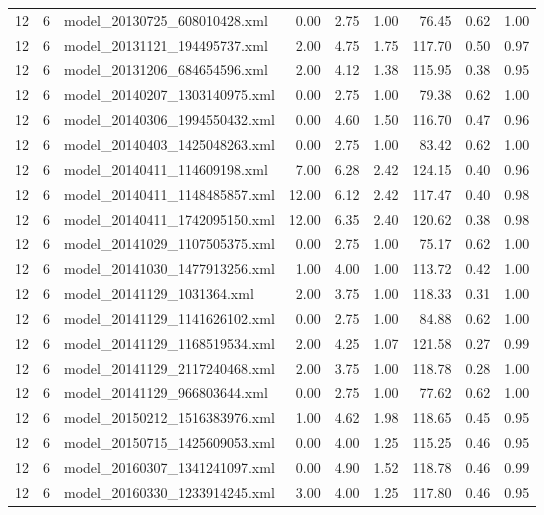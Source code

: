 \begin{table}[ht]
\begin{tabular}{rrlrrrrrr}
   12 &   6 & model\_20130725\_608010428.xml & 0.00 & 2.75 & 1.00 & 76.45 & 0.62 & 1.00 \\ 
   12 &   6 & model\_20131121\_194495737.xml & 2.00 & 4.75 & 1.75 & 117.70 & 0.50 & 0.97 \\ 
   12 &   6 & model\_20131206\_684654596.xml & 2.00 & 4.12 & 1.38 & 115.95 & 0.38 & 0.95 \\ 
   12 &   6 & model\_20140207\_1303140975.xml & 0.00 & 2.75 & 1.00 & 79.38 & 0.62 & 1.00 \\ 
   12 &   6 & model\_20140306\_1994550432.xml & 0.00 & 4.60 & 1.50 & 116.70 & 0.47 & 0.96 \\ 
   12 &   6 & model\_20140403\_1425048263.xml & 0.00 & 2.75 & 1.00 & 83.42 & 0.62 & 1.00 \\ 
   12 &   6 & model\_20140411\_114609198.xml & 7.00 & 6.28 & 2.42 & 124.15 & 0.40 & 0.96 \\ 
   12 &   6 & model\_20140411\_1148485857.xml & 12.00 & 6.12 & 2.42 & 117.47 & 0.40 & 0.98 \\ 
   12 &   6 & model\_20140411\_1742095150.xml & 12.00 & 6.35 & 2.40 & 120.62 & 0.38 & 0.98 \\ 
   12 &   6 & model\_20141029\_1107505375.xml & 0.00 & 2.75 & 1.00 & 75.17 & 0.62 & 1.00 \\ 
   12 &   6 & model\_20141030\_1477913256.xml & 1.00 & 4.00 & 1.00 & 113.72 & 0.42 & 1.00 \\ 
   12 &   6 & model\_20141129\_1031364.xml & 2.00 & 3.75 & 1.00 & 118.33 & 0.31 & 1.00 \\ 
   12 &   6 & model\_20141129\_1141626102.xml & 0.00 & 2.75 & 1.00 & 84.88 & 0.62 & 1.00 \\ 
   12 &   6 & model\_20141129\_1168519534.xml & 2.00 & 4.25 & 1.07 & 121.58 & 0.27 & 0.99 \\ 
   12 &   6 & model\_20141129\_2117240468.xml & 2.00 & 3.75 & 1.00 & 118.78 & 0.28 & 1.00 \\ 
   12 &   6 & model\_20141129\_966803644.xml & 0.00 & 2.75 & 1.00 & 77.62 & 0.62 & 1.00 \\ 
   12 &   6 & model\_20150212\_1516383976.xml & 1.00 & 4.62 & 1.98 & 118.65 & 0.45 & 0.95 \\ 
   12 &   6 & model\_20150715\_1425609053.xml & 0.00 & 4.00 & 1.25 & 115.25 & 0.46 & 0.95 \\ 
   12 &   6 & model\_20160307\_1341241097.xml & 0.00 & 4.90 & 1.52 & 118.78 & 0.46 & 0.99 \\ 
   12 &   6 & model\_20160330\_1233914245.xml & 3.00 & 4.00 & 1.25 & 117.80 & 0.46 & 0.95 \\ 

\end{tabular}
\end{table}
